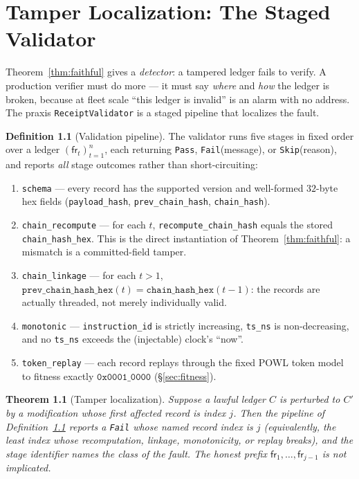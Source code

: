 \documentclass[11pt,oneside]{book}
\theoremstyle{definition}
\newtheorem{definition}{Definition}[chapter]
\theoremstyle{plain}
\newtheorem{theorem}{Theorem}[chapter]
\theoremstyle{remark}
\newcommand{\fr}{\mathsf{fr}}                   %
\newcommand{\code}[1]{\texttt{#1}}
\newcommand{\Ledger}{C}               %
\begin{document}
\chapter{Tamper Localization: The Staged Validator}
\label{ch:localize}

Theorem~\ref{thm:faithful} gives a \emph{detector}: a tampered ledger fails to verify. %
A production verifier must do more --- it must say \emph{where} and \emph{how} the ledger is broken, because at fleet scale ``this ledger is invalid'' is an alarm with no address. %
The praxis \code{ReceiptValidator} is a staged pipeline that localizes the fault. %

\begin{definition}[Validation pipeline]\label{def:pipeline}
The validator runs five stages in fixed order over a ledger $(\fr_t)_{t=1}^{n}$, each returning \code{Pass}, \code{Fail}(message), or \code{Skip}(reason), and reports \emph{all} stage outcomes rather than short-circuiting: %
\begin{enumerate}[label=(S\arabic*),leftmargin=*]
\item \code{schema} --- every record has the supported version and well-formed
$32$-byte hex fields (\code{payload\_hash}, \code{prev\_chain\_hash}, \code{chain\_hash}). %
\item \code{chain\_recompute} --- for each $t$, \code{recompute\_chain\_hash} equals the stored
\code{chain\_hash\_hex}. %
This is the direct instantiation of Theorem~\ref{thm:faithful}: a mismatch is a committed-field tamper. %
\item \code{chain\_linkage} --- for each $t>1$, $\code{prev\_chain\_hash\_hex}(t)=
\code{chain\_hash\_hex}(t-1)$: the records are actually threaded, not merely individually valid. %
\item \code{monotonic} --- \code{instruction\_id} is strictly increasing, \code{ts\_ns} is
non-decreasing, and no \code{ts\_ns} exceeds the (injectable) clock's ``now''. %
\item \code{token\_replay} --- each record replays through the fixed POWL token model to
fitness exactly $\code{0x0001\_0000}$ (\S\ref{sec:fitness}). %
\end{enumerate}
\end{definition}

\begin{theorem}[Tamper localization]\label{thm:localize}
Suppose a lawful ledger $\Ledger$ is perturbed to $\Ledger'$ by a modification whose first affected record is index $j$. %
Then the pipeline of Definition~\ref{def:pipeline} reports a \code{Fail} whose named record index is $j$ (equivalently, the least index whose recomputation, linkage, monotonicity, or replay breaks), and the stage identifier names the class of the fault. %
The honest prefix $\fr_1,\dots,\fr_{j-1}$ is not implicated. %
\end{theorem}
\end{document}
